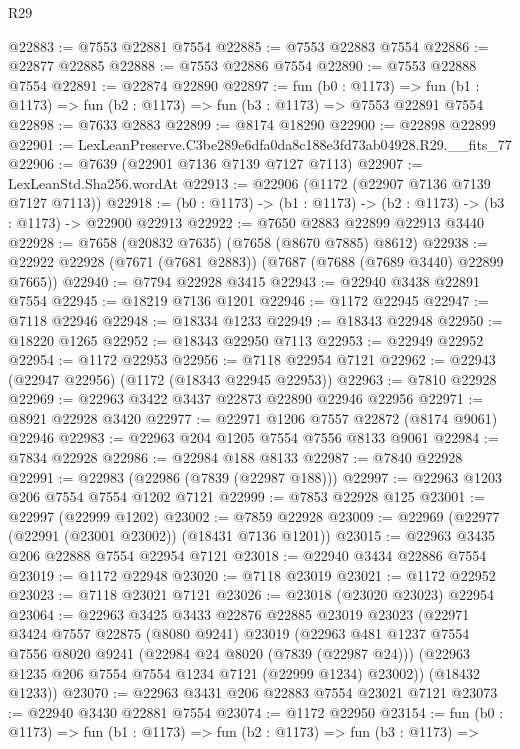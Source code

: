 \begin{lexlean}{R29}
\begin{coremodule}
@22883 := @7553 @22881 @7554
@22885 := @7553 @22883 @7554
@22886 := @22877 @22885
@22888 := @7553 @22886 @7554
@22890 := @7553 @22888 @7554
@22891 := @22874 @22890
@22897 := fun (b0 : @1173) =>
  fun (b1 : @1173) => fun (b2 : @1173) => fun (b3 : @1173) => @7553 @22891 @7554
@22898 := @7633 @2883
@22899 := @8174 @18290
@22900 := @22898 @22899
@22901 := LexLeanPreserve.C3be289e6dfa0da8c188e3fd73ab04928.R29.__fits_77
@22906 := @7639 (@22901 @7136 @7139 @7127 @7113)
@22907 := LexLeanStd.Sha256.wordAt
@22913 := @22906 (@1172 (@22907 @7136 @7139 @7127 @7113))
@22918 := (b0 : @1173) -> (b1 : @1173) -> (b2 : @1173) -> (b3 : @1173) -> @22900 @22913
@22922 := @7650 @2883 @22899 @22913 @3440
@22928 := @7658 (@20832 @7635) (@7658 (@8670 @7885) @8612)
@22938 := @22922 @22928 (@7671 (@7681 @2883)) (@7687 (@7688 (@7689 @3440) @22899 @7665))
@22940 := @7794 @22928 @3415
@22943 := @22940 @3438 @22891 @7554
@22945 := @18219 @7136 @1201
@22946 := @1172 @22945
@22947 := @7118 @22946
@22948 := @18334 @1233
@22949 := @18343 @22948
@22950 := @18220 @1265
@22952 := @18343 @22950 @7113
@22953 := @22949 @22952
@22954 := @1172 @22953
@22956 := @7118 @22954 @7121
@22962 := @22943 (@22947 @22956) (@1172 (@18343 @22945 @22953))
@22963 := @7810 @22928
@22969 := @22963 @3422 @3437 @22873 @22890 @22946 @22956
@22971 := @8921 @22928 @3420
@22977 := @22971 @1206 @7557 @22872 (@8174 @9061) @22946
@22983 := @22963 @204 @1205 @7554 @7556 @8133 @9061
@22984 := @7834 @22928
@22986 := @22984 @188 @8133
@22987 := @7840 @22928
@22991 := @22983 (@22986 (@7839 (@22987 @188)))
@22997 := @22963 @1203 @206 @7554 @7554 @1202 @7121
@22999 := @7853 @22928 @125
@23001 := @22997 (@22999 @1202)
@23002 := @7859 @22928
@23009 := @22969 (@22977 (@22991 (@23001 @23002)) (@18431 @7136 @1201))
@23015 := @22963 @3435 @206 @22888 @7554 @22954 @7121
@23018 := @22940 @3434 @22886 @7554
@23019 := @1172 @22948
@23020 := @7118 @23019
@23021 := @1172 @22952
@23023 := @7118 @23021 @7121
@23026 := @23018 (@23020 @23023) @22954
@23064 := @22963
    @3425
    @3433
    @22876
    @22885
    @23019
    @23023
    (@22971
      @3424
      @7557
      @22875
      (@8080 @9241)
      @23019
      (@22963
        @481
        @1237
        @7554
        @7556
        @8020
        @9241
        (@22984 @24 @8020 (@7839 (@22987 @24)))
        (@22963 @1235 @206 @7554 @7554 @1234 @7121 (@22999 @1234) @23002))
      (@18432 @1233))
@23070 := @22963 @3431 @206 @22883 @7554 @23021 @7121
@23073 := @22940 @3430 @22881 @7554
@23074 := @1172 @22950
@23154 := fun (b0 : @1173) =>
  fun (b1 : @1173) =>
  fun (b2 : @1173) =>
  fun (b3 : @1173) =>

\end{coremodule}
\end{lexlean}
